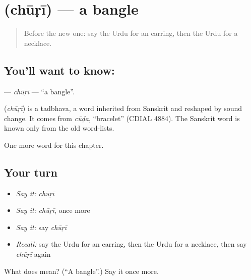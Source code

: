 \section[\texorpdfstring{\ur{چوڑی} (chūṛī)}{چوڑی (chūṛī)}]{ (chūṛī) — a bangle}

\label{lesson:UR-C166-churi}



\begin{quote}
Before the new one: say the Urdu for an earring, then the Urdu for a necklace.
\end{quote}

\subsection*{You'll want to know: }
\textbf{} — \emph{chūṛī} — \textquotedblleft{}a bangle\textquotedblright{}.

\begin{cousinweb}
\textbf{} (\emph{chūṛī}) is a tadbhava, a word inherited from Sanskrit and reshaped by sound change. It comes from \emph{cūḍa}, \textquotedblleft{}bracelet\textquotedblright{} (CDIAL 4884). The Sanskrit word is known only from the old word-lists.
\end{cousinweb}

\begin{grammarlens}[title={What you've built}]
One more word for this chapter.
\end{grammarlens}

\subsection*{Your turn}
\begin{itemize}
\raggedright
  \item \emph{Say it:} \emph{chūṛī}
  \item \emph{Say it:} \emph{chūṛī}, once more
  \item \emph{Say it:} say \emph{chūṛī}
  \item \emph{Recall:} say the Urdu for an earring, then the Urdu for a necklace, then say \emph{chūṛī} again
\end{itemize}

\begin{tcolorbox}[breakable,colback=teal!4,colframe=teal!35!black,title={Before you move on}]
What does  mean? (\textquotedblleft{}A bangle\textquotedblright{}.) Say it once more.
\end{tcolorbox}
